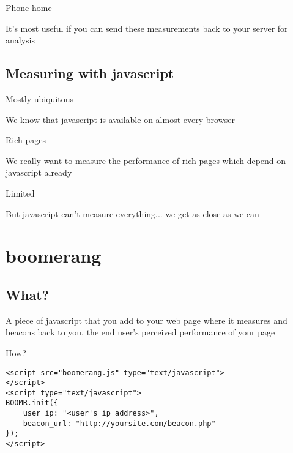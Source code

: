 \documentclass{beamer}
\begin{document}
\begin{frame}{Phone home}
  \begin{center}
  It's most useful if you can send these measurements back to your server for analysis
  \end{center}
\end{frame}

\subsection{Measuring with javascript}

\begin{frame}{Mostly ubiquitous}
  \begin{center}
  We know that javascript is available on almost every browser
  \end{center}
\end{frame}

\begin{frame}{Rich pages}
  \begin{center}
  We really want to measure the performance of rich pages which depend on javascript already
  \end{center}
\end{frame}

\begin{frame}{Limited}
  \begin{center}
  But javascript can't measure everything... we get as close as we can
  \end{center}
\end{frame}

\section{boomerang}

\subsection{What?}

\begin{frame}
  \begin{block}{}
A piece of javascript that you add to your web page where it measures and beacons back to you, the end user's perceived performance of your page
  \end{block}
\end{frame}

\begin{frame}[fragile]{How?}
  \begin{verbatim}
<script src="boomerang.js" type="text/javascript">
</script>
<script type="text/javascript">
BOOMR.init({
    user_ip: "<user's ip address>",
    beacon_url: "http://yoursite.com/beacon.php"
});
</script>
  \end{verbatim}
\end{frame}
\end{document}
